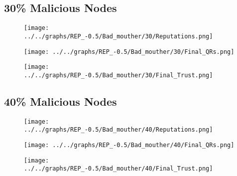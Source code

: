 \begin{minipage}[t]{0.49\columnwidth}
\subsection*{30\% Malicious Nodes}
    \begin{figure}[H]
        \centering
        \texttt{[image: ../../graphs/REP\_-0.5/Bad\_mouther/30/Reputations.png]}
    \end{figure}
    \begin{figure}[H]
        \centering
        \texttt{[image: ../../graphs/REP\_-0.5/Bad\_mouther/30/Final\_QRs.png]}
    \end{figure}
\end{minipage}
\begin{minipage}[t]{0.49\columnwidth}
    \begin{figure}[H]
        \centering
        \texttt{[image: ../../graphs/REP\_-0.5/Bad\_mouther/30/Final\_Trust.png]}
    \end{figure}
\end{minipage}

\begin{minipage}[t]{0.49\columnwidth}
\subsection*{40\% Malicious Nodes}
    \begin{figure}[H]
        \centering
        \texttt{[image: ../../graphs/REP\_-0.5/Bad\_mouther/40/Reputations.png]}
    \end{figure}
    \begin{figure}[H]
        \centering
        \texttt{[image: ../../graphs/REP\_-0.5/Bad\_mouther/40/Final\_QRs.png]}
    \end{figure}
\end{minipage}
\begin{minipage}[t]{0.49\columnwidth}
    \begin{figure}[H]
        \centering
        \texttt{[image: ../../graphs/REP\_-0.5/Bad\_mouther/40/Final\_Trust.png]}
    \end{figure}
\end{minipage}

